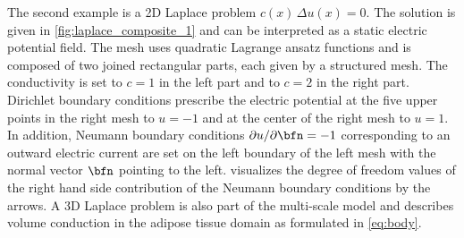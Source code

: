 The second example is a 2D Laplace problem $c(x)\,\Delta u(x) = 0$. The solution is given in \cref{fig:laplace_composite_1} and can be interpreted as a static electric potential field. 
The mesh uses quadratic Lagrange ansatz functions and is composed of two joined rectangular parts, each given by a structured mesh. The conductivity is set to $c=1$ in the left part and to $c=2$ in the right part. Dirichlet boundary conditions prescribe the electric potential at the five upper points in the right mesh to $u = -1$ and at the center of the right mesh to $u=1$. In addition, Neumann boundary conditions $\partial u / \partial \bfn = -1$ corresponding to an outward electric current are set on the left boundary of the left mesh with the normal vector $\bfn$ pointing to the left.  visualizes the degree of freedom values of the right hand side contribution of the Neumann boundary conditions by the arrows. 
A 3D Laplace problem is also part of the multi-scale model and describes volume conduction in the adipose tissue domain as formulated in \cref{eq:body}.


